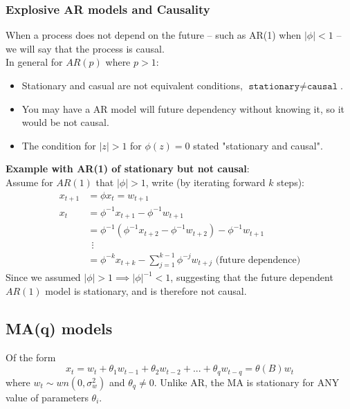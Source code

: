 \documentclass[11pt]{article}
\newcommand{\noi}{\noindent}
\begin{document}
\subsubsection{Explosive AR models and Causality}
\noi When a process does not depend on the future -- such as AR(1) when $|\phi| < 1$ -- we will say that the process is causal. \\

\noi In general for $AR(p)$ where $p > 1$:
\begin{itemize}
    \item Stationary and casual are not equivalent conditions, $\texttt{stationary} \neq \texttt{causal}$.
    \item You may have a AR model will future dependency without knowing it, so it would be not causal.
    \item The condition for $|z|>1$ for $\phi(z) = 0$ stated "stationary and causal".
\end{itemize} \phantom{i}

\noi \textbf{Example with AR(1) of stationary but not causal}: \\
\noi Assume for $AR(1)$ that $|\phi| > 1$, write (by iterating forward $k$ steps):
\begin{align*}
    x_{t+1} &= \phi x_t = w_{t+1} \\
    x_t &= \phi^{-1}x_{t+1} - \phi^{-1}w_{t+1} \\
    &= \phi^{-1}(\phi^{-1}x_{t+2} - \phi^{-1}w_{t+2}) - \phi^{-1}w_{t+1} \\
    & \ \ \vdots \\
    &= \phi^{-k}x_{t+k} - \sum_{j=1}^{k-1}{\phi^{-j}w_{t+j}} \text{ (future dependence)}
\end{align*} \phantom{i}
\noi Since we assumed $|\phi| > 1 \implies |\phi|^{-1} < 1$, suggesting that the future dependent $AR(1)$ model is stationary, and is therefore not causal.

\subsection{MA(q) models}
\noi Of the form
$$x_t = w_t + \theta_1w_{t-1} + \theta_2w_{t-2} + ... + \theta_qw_{t-q} = \theta(B)w_t$$
\noi where $w_t \sim wn(0, \sigma_w^2)$ and $\theta_q \neq 0$. Unlike AR, the MA is stationary for ANY value of parameters $\theta_i$. \\
\end{document}
